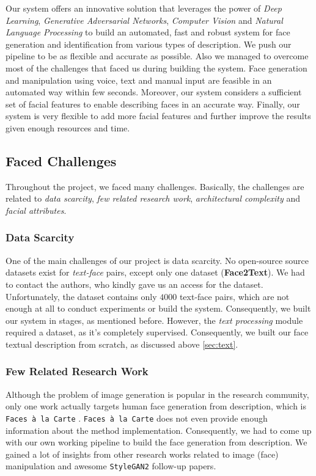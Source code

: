 Our system offers an innovative solution that leverages the power of \emph{Deep Learning}, \emph{Generative Adversarial Networks}, \emph{Computer Vision} and \emph{Natural Language Processing} to build an automated, fast and robust system for face generation and identification from various types of description. We push our pipeline to be as flexible and accurate as possible. Also we managed to overcome most of the challenges that faced us during building the system. Face generation and manipulation using voice, text and manual input are feasible in an automated way within few seconds. Moreover, our system considers a sufficient set of facial features to enable describing faces in an accurate way. Finally, our system is very flexible to add more facial features and further improve the results given enough resources and time.

\subsection{Faced Challenges}
Throughout the project, we faced many challenges. Basically, the challenges are related to \emph{data scarcity}, \emph{few related research work}, \emph{architectural complexity} and \emph{facial attributes}.

\subsubsection{Data Scarcity}
One of the main challenges of our project is data scarcity. No open-source source datasets exist for \emph{text-face} pairs, except only one dataset (\textbf{Face2Text}). We had to contact the authors, who kindly gave us an access for the dataset. Unfortunately, the dataset contains only $4000$ text-face pairs, which are not enough at all to conduct experiments or build the system. Consequently, we built our system in stages, as mentioned before. However, the \emph{text processing} module required a dataset, as it's completely supervised. Consequently, we built our face textual description from scratch, as discussed above \ref{sec:text}.

\subsubsection{Few Related Research Work}
Although the problem of image generation is popular in the research community, only one work actually targets human face generation from description, which is \texttt{Faces à la Carte} \cite{wang2020faces}. \texttt{Faces à la Carte} does not even provide enough information about the method implementation. Consequently, we had to come up with our own working pipeline to build the face generation from description. We gained a lot of insights from other research works related to image (face) manipulation and awesome \texttt{StyleGAN2} follow-up papers.

